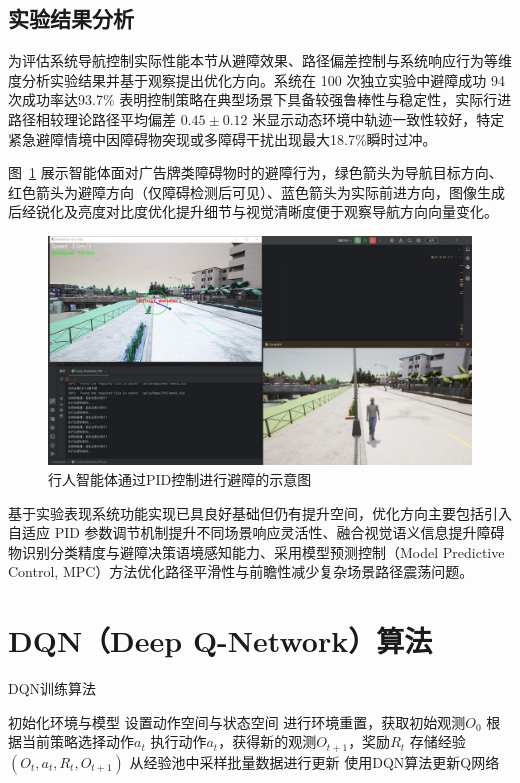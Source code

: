\subsection{实验结果分析}

为评估系统导航控制实际性能本节从避障效果、路径偏差控制与系统响应行为等维度分析实验结果并基于观察提出优化方向。系统在 100 次独立实验中避障成功 94 次成功率达93.7\% 表明控制策略在典型场景下具备较强鲁棒性与稳定性，实际行进路径相较理论路径平均偏差  $0.45 \pm 0.12$ 米显示动态环境中轨迹一致性较好，特定紧急避障情境中因障碍物突现或多障碍干扰出现最大18.7\%瞬时过冲。

图~\ref{fig:pid_obstacle} 展示智能体面对广告牌类障碍物时的避障行为，绿色箭头为导航目标方向、红色箭头为避障方向（仅障碍检测后可见）、蓝色箭头为实际前进方向，图像生成后经锐化及亮度对比度优化提升细节与视觉清晰度便于观察导航方向向量变化。

\begin{figure}[H]
    \centering
    \includegraphics[width=1\textwidth]{images/obstacle_avoidance.pdf}
    \caption{行人智能体通过PID控制进行避障的示意图}
    \label{fig:pid_obstacle}
\end{figure}

基于实验表现系统功能实现已具良好基础但仍有提升空间，优化方向主要包括引入自适应 PID 参数调节机制提升不同场景响应灵活性、融合视觉语义信息提升障碍物识别分类精度与避障决策语境感知能力、采用模型预测控制（Model Predictive Control, MPC）方法优化路径平滑性与前瞻性减少复杂场景路径震荡问题。

\section{DQN（Deep Q-Network）算法}

\begin{algorithm}[H]
    \caption{DQN训练算法}
    \begin{algorithmic}[1]
    \STATE 初始化环境与模型
    \STATE 设置动作空间与状态空间
        \STATE 进行环境重置，获取初始观测$O_0$
            \STATE 根据当前策略选择动作$a_t$
            \STATE 执行动作$a_t$，获得新的观测$O_{t+1}$，奖励$R_t$
            \STATE 存储经验$(O_t, a_t, R_t, O_{t+1})$
            \STATE 从经验池中采样批量数据进行更新
            \STATE 使用DQN算法更新Q网络
        \ENDFOR
    \ENDWHILE
    \end{algorithmic}
\end{algorithm}

